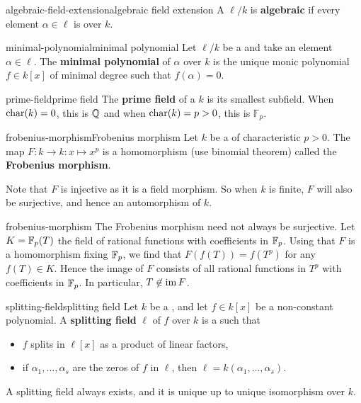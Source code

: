 \begin{topic}{algebraic-field-extension}{algebraic field extension}
    A  $\ell / k$ is \textbf{algebraic} if every element $\alpha \in \ell$ is  over $k$.
\end{topic}

\begin{topic}{minimal-polynomial}{minimal polynomial}
    Let $\ell / k$ be a  and take an  element $\alpha \in \ell$. The \textbf{minimal polynomial} of $\alpha$ over $k$ is the unique monic polynomial $f \in k[x]$ of minimal degree such that $f(\alpha) = 0$.
\end{topic}

\begin{topic}{prime-field}{prime field}
    The \textbf{prime field} of a  $k$ is its smallest subfield. When $\textup{char}(k) = 0$, this is $\mathbb{Q}$ and when $\textup{char}(k) = p > 0$, this is $\mathbb{F}_p$.
\end{topic}

\begin{topic}{frobenius-morphism}{Frobenius morphism}
    Let $k$ be a  of characteristic $p > 0$. The map $F : k \to k : x \mapsto x^p$ is a homomorphism (use binomial theorem) called the \textbf{Frobenius morphism}.
    
    Note that $F$ is injective as it is a field morphism. So when $k$ is finite, $F$ will also be surjective, and hence an automorphism of $k$. 
\end{topic}

\begin{example}{frobenius-morphism}
    The Frobenius morphism need not always be surjective. Let $K = \mathbb{F}_p(T)$ the field of rational functions with coefficients in $\mathbb{F}_p$. Using that $F$ is a homomorphism fixing $\mathbb{F}_p$, we find that $F(f(T)) = f(T^p)$ for any $f(T) \in K$. Hence the image of $F$ consists of all rational functions in $T^p$ with coefficients in $\mathbb{F}_p$. In particular, $T \not\in \operatorname{im} F$.
\end{example}

\begin{topic}{splitting-field}{splitting field}
    Let $k$ be a , and let $f \in k[x]$ be a non-constant polynomial. A \textbf{splitting field} $\ell$ of $f$ over $k$ is a  such that
    \begin{itemize}
        \item $f$ splits in $\ell[x]$ as a product of linear factors,
        \item if $\alpha_1, \ldots, \alpha_s$ are the zeros of $f$ in $\ell$, then $\ell = k(\alpha_1, \ldots, \alpha_s)$.
    \end{itemize}
    A splitting field always exists, and it is unique up to unique isomorphism over $k$.
\end{topic}

